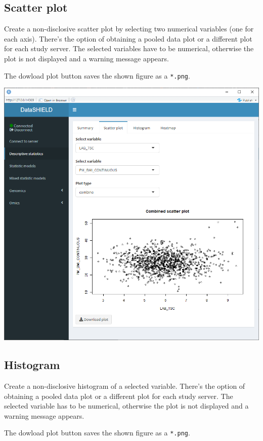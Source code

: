 \documentclass[
]{book}
\begin{document}
\hypertarget{scatter-plot}{%
\subsection{Scatter plot}\label{scatter-plot}}

Create a non-disclosive scatter plot by selecting two numerical variables (one for each axis). There's the option of obtaining a pooled data plot or a different plot for each study server. The selected variables have to be numerical, otherwise the plot is not displayed and a warning message appears.

The dowload plot button saves the shown figure as a \texttt{*.png}.

\includegraphics{images/descriptive_stats3.png}

\hypertarget{histogram}{%
\subsection{Histogram}\label{histogram}}

Create a non-disclosive histogram of a selected variable. There's the option of obtaining a pooled data plot or a different plot for each study server. The selected variable has to be numerical, otherwise the plot is not displayed and a warning message appears.

The dowload plot button saves the shown figure as a \texttt{*.png}.
\end{document}
